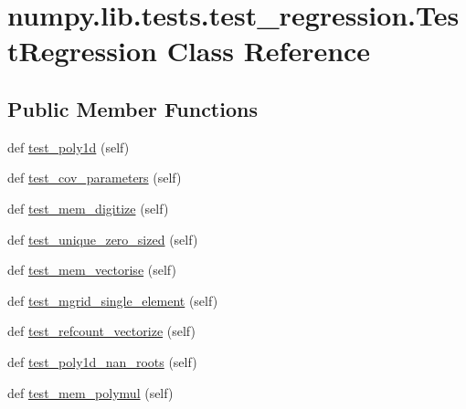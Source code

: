\hypertarget{classnumpy_1_1lib_1_1tests_1_1test__regression_1_1TestRegression}{}\section{numpy.\+lib.\+tests.\+test\+\_\+regression.\+Test\+Regression Class Reference}
\label{classnumpy_1_1lib_1_1tests_1_1test__regression_1_1TestRegression}
\subsection*{Public Member Functions}
\begin{DoxyCompactItemize}
\item 
def \hyperlink{classnumpy_1_1lib_1_1tests_1_1test__regression_1_1TestRegression_a7dd913cd30352e7aac94193b1ef21eba}{test\+\_\+poly1d} (self)
\item 
def \hyperlink{classnumpy_1_1lib_1_1tests_1_1test__regression_1_1TestRegression_a0be0fcbc52da71ea655158d549eae97d}{test\+\_\+cov\+\_\+parameters} (self)
\item 
def \hyperlink{classnumpy_1_1lib_1_1tests_1_1test__regression_1_1TestRegression_a3c5f9fda512a9d3f94a8f39e046aad49}{test\+\_\+mem\+\_\+digitize} (self)
\item 
def \hyperlink{classnumpy_1_1lib_1_1tests_1_1test__regression_1_1TestRegression_a091c199d31f4da1d82c1b2f504254b38}{test\+\_\+unique\+\_\+zero\+\_\+sized} (self)
\item 
def \hyperlink{classnumpy_1_1lib_1_1tests_1_1test__regression_1_1TestRegression_a2b4c33e0ff3b9220bc1e2305e0d2f4c6}{test\+\_\+mem\+\_\+vectorise} (self)
\item 
def \hyperlink{classnumpy_1_1lib_1_1tests_1_1test__regression_1_1TestRegression_a5170198b5c8afbdc312dc5096daece95}{test\+\_\+mgrid\+\_\+single\+\_\+element} (self)
\item 
def \hyperlink{classnumpy_1_1lib_1_1tests_1_1test__regression_1_1TestRegression_ad08c3fa9d68057476c859db1397e1023}{test\+\_\+refcount\+\_\+vectorize} (self)
\item 
def \hyperlink{classnumpy_1_1lib_1_1tests_1_1test__regression_1_1TestRegression_afcb9842fe3c3c3dff4e937e5aec37725}{test\+\_\+poly1d\+\_\+nan\+\_\+roots} (self)
\item 
def \hyperlink{classnumpy_1_1lib_1_1tests_1_1test__regression_1_1TestRegression_a227f16833234d5ec24479c166bf2b8de}{test\+\_\+mem\+\_\+polymul} (self)

\end{DoxyCompactItemize}
